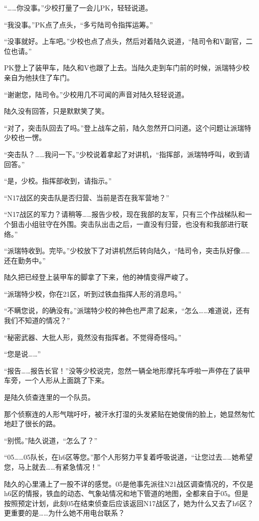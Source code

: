 “……你没事。”少校打量了一会儿PK，轻轻说道。

“我没事。”PK点了点头，“多亏陆司令指挥运筹。”

“没事就好。上车吧。”少校也点了点头，然后对着陆久说道，“陆司令和V副官，二位也请。”

PK登上了装甲车，陆久和V也跟了上去。当陆久走到车门前的时候，派瑞特少校亲自为他扶住了车门。

“谢谢您，陆司令。”少校用几不可闻的声音对陆久轻轻说道。

陆久没有回答，只是默默笑了笑。

“对了，突击队回去了吗。”登上战车之前，陆久忽然开口问道。这个问题让派瑞特少校也一愣。

“突击队？……我问一下。”少校说着拿起了对讲机，“指挥部，派瑞特呼叫，收到请回答。”

“是，少校。指挥部收到，请指示。”

“N17战区的突击队是否归营、当前是否在我军营地？”

“N17战区的军力？请稍等……报告少校，现在我部的友军，只有三个作战梯队和一个狙击小组驻守在外围。突击队出击之后，一直没有归营，也没有和我部进行联络。”

“派瑞特收到。完毕。”少校放下了对讲机然后转向陆久，“陆司令，突击队好像……还在勤务中。”

陆久把已经登上装甲车的脚拿了下来，他的神情变得严峻了。

“派瑞特少校，你在21区，听到过铁血指挥人形的消息吗。”

“不瞒您说，的确没有。”派瑞特少校的神色也严肃了起来，“怎么……难道说，还有我们不知道的情况？”

“秘密武器、大批人形，竟然没有指挥者。不觉得奇怪吗。”

“您是说……”

“报告……报告长官！”没等少校说完，忽然一辆全地形摩托车呼啦一声停在了装甲车旁，一个人形从上面跳了下来。

是陆久侦查连里的一个队员。

那个侦察连的人形气喘吁吁，被汗水打湿的头发紧贴在她俊俏的脸上，她显然匆忙地赶了很长的路。

“别慌。”陆久说道，“怎么了？”

“05……05队长，在h6区等您。”那个人形努力平复着呼吸说道，“让您过去……她希望您，马上就去……有紧急情况！”

陆久的心里涌上了一股不详的感觉。05是他事先派往N21战区调查情况的，不仅是h6区的情报，铁血的动态、气象站情况和地下管道的地图，全都来自于05。但是按照预定计划，此刻05在结束侦查后应该返回N17战区了，她为什么又去了h6区？更重要的是……为什么她不用电台联系？

